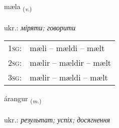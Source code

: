 \documentclass[frontgrid, backgrid]{flacards}\usepackage[]{graphicx}\usepackage[]{xcolor}
\begin{document}
\renewcommand{\flhead}{\vskip5pt \fboxsep=0pt {\small\bfseries\footnotesize Sagnorð | дієслово}}
\renewcommand{\fcfoot}{\vskip5pt \fboxsep=0pt \hspace{2pt}{\small\bfseries\footnotesize 1K}}

\renewcommand{\blhead}{\vskip5pt {\small\bfseries\footnotesize Sagnorð | дієслово }}
\renewcommand{\bcfoot}{\vskip5pt \hspace{2pt}{\small\bfseries\footnotesize 1K}}


{mæla \small{\textsubscript{(\textit{v.})}} \\[1ex] %
\textphonetic{[maiːla]} \\
ukr.: \emph{міряти; говорити} \\  [2ex]
\renewcommand*{\arraystretch}{0.8}
\begin{tabular}{p{1cm}l}
\textsc{1sg}: & mæli -- mældi -- mælt \\ 
\textsc{2sg}: & mælir -- mældir -- mælt \\ 
\textsc{3sg}: & mælir -- mældi -- mælt \\ 
\end{tabular}
}

\renewcommand{\flhead}{\vskip5pt \fboxsep=0pt {\small\bfseries\footnotesize Nafnorð | іменник}}
\renewcommand{\fcfoot}{\vskip5pt \fboxsep=0pt \hspace{2pt}{\small\bfseries\footnotesize 1K}}

\renewcommand{\blhead}{\vskip5pt {\small\bfseries\footnotesize Nafnorð | іменник }}
\renewcommand{\bcfoot}{\vskip5pt \hspace{2pt}{\small\bfseries\footnotesize 1K}}


{árangur \small{\textsubscript{(\textit{m.})}} \\[1ex] %
\textphonetic{[auːrauŋkʏr]} \\
ukr.: \emph{результат; успіх; досягнення} \\  [2ex]
\renewcommand*{\arraystretch}{0.8}
}
\end{document}
